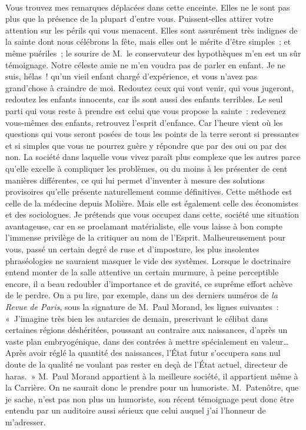 \documentclass[french,twoside]{book} %
\begin{document}
\noindent  \par
Vous trouvez mes remarques déplacées dans cette enceinte. Elles ne le sont pas plus que la présence de la plupart d’entre vous. Puissent-elles attirer votre attention sur les périls qui vous menacent. Elles sont assurément très indignes de la sainte dont nous célébrons la fête, mais elles ont le mérite d’être simples ; et même puériles ; le sourire de M. le conservateur des hypothèques m’en est un sûr témoignage. Notre céleste amie ne m’en voudra pas de parler en enfant. Je ne suis, hélas ! qu’un vieil enfant chargé d’expérience, et vous n’avez pas grand’chose à craindre de moi. Redoutez ceux qui vont venir, qui vous jugeront, redoutez les enfants innocents, car ils sont aussi des enfants terribles. Le seul parti qui vous reste à prendre est celui que vous propose la sainte : redevenez vous-mêmes des enfants, retrouvez l’esprit d’enfance. Car l’heure vient où les questions qui vous seront posées de tous les points de la terre seront si pressantes et si simples que vous ne pourrez guère y répondre que par des oui ou par des non. La société dans laquelle vous vivez paraît plus complexe que les autres parce qu’elle excelle à compliquer les problèmes, ou du moins à les présenter de cent manières différentes, ce qui lui permet d’inventer à mesure des solutions provisoires qu’elle présente naturellement comme définitives. Cette méthode est celle de la médecine depuis Molière. Mais elle est également celle des économistes et des sociologues. Je prétends que vous occupez dans cette, société une situation avantageuse, car en se proclamant matérialiste, elle vous laisse à bon compte l’immense privilège de la critiquer au nom de l’Esprit. Malheureusement pour vous, passé un certain degré de ruse et d’imposture, les plus insolentes phraséologies ne sauraient masquer le vide des systèmes. Lorsque le doctrinaire entend monter de la salle attentive un certain murmure, à peine perceptible encore, il a beau redoubler d’importance et de gravité, ce suprême effort achève de le perdre. On a pu lire, par exemple, dans un des derniers numéros de \emph{la Revue de Paris}, sous la signature de M. Paul Morand, les lignes suivantes : « J’imagine très bien les autarcies de demain, prescrivant le célibat dans certaines régions déshéritées, poussant au contraire aux naissances, d’après un vaste plan embryogénique, dans des contrées à mettre spécialement en valeur… Après avoir réglé la quantité des naissances, l’État futur s’occupera sans nul doute de la qualité ne voulant pas rester en deçà de l’État actuel, directeur de haras. » M. Paul Morand appartient à la meilleure société, il appartient même à la Carrière. On ne saurait donc le prendre pour un humoriste. M. Patenôtre, que je sache, n’est pas non plus un humoriste, son récent témoignage peut donc être entendu par un auditoire aussi sérieux que celui auquel j’ai l’honneur de m’adresser.\par
\end{document}
